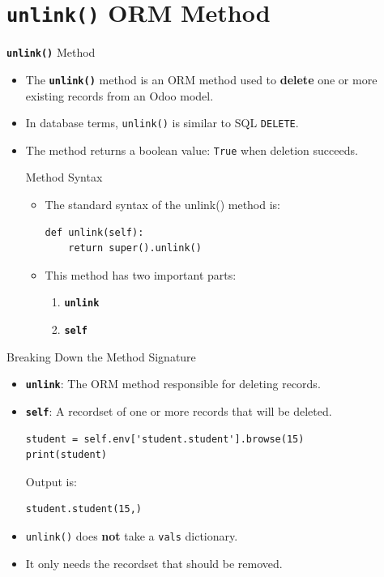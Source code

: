 
\section{\textbf{\texttt{unlink()}} ORM Method}

\begin{frame}[fragile]{\textbf{\texttt{unlink()}} Method}
	\begin{itemize}
		\item The \textbf{\texttt{unlink()}} method is an ORM method used to \textbf{delete} one or more existing records from an Odoo model.
		\item In database terms, \texttt{unlink()} is similar to SQL \texttt{DELETE}.
		\item The method returns a boolean value: \texttt{True} when deletion succeeds.
\begin{block}{Method Syntax}
	\begin{itemize}
		\item The standard syntax of the unlink() method is:
\begin{lstlisting}
def unlink(self):
	return super().unlink()
\end{lstlisting}
		\item This method has two important parts:
		\begin{enumerate}
			\item \textbf{\texttt{unlink}}
			\item \textbf{\texttt{self}}
		\end{enumerate}
	\end{itemize}
\end{block}
	\end{itemize}
\end{frame}

\begin{frame}[fragile]{Breaking Down the Method Signature}
	\begin{block}{}
		\begin{itemize}
			\item \textbf{\texttt{unlink}}: The ORM method responsible for deleting records.
			\item \textbf{\texttt{self}}: A recordset of one or more records that will be deleted.
\begin{lstlisting}
student = self.env['student.student'].browse(15)
print(student)
\end{lstlisting}
			Output is:
\begin{lstlisting}
student.student(15,)
\end{lstlisting}
			\item \texttt{unlink()} does \textbf{not} take a \texttt{vals} dictionary.
			\item It only needs the recordset that should be removed.
		\end{itemize}
	\end{block}
\end{frame}


